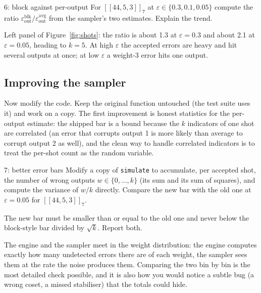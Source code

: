 \documentclass[11pt]{article}
\newcommand{\eps}{\varepsilon}
\newcommand{\code}[1]{\texttt{#1}}
\begin{document}
\begin{exercise}{6: block against per-output}
For $[[44,5,3]]_7$ at $\eps\in\{0.3,0.1,0.05\}$ compute the ratio
$\eps_{\mathrm{out}}^{\mathrm{blk}}/\eps_{\mathrm{out}}^{\mathrm{avg}}$ from the
sampler's two estimates. Explain the trend.
\end{exercise}
\begin{checkbox}
Left panel of Figure~\ref{fig:shots}: the ratio is about 1.3 at $\eps=0.3$ and about
2.1 at $\eps=0.05$, heading to $k=5$. At high $\eps$ the accepted errors are heavy and
hit several outputs at once; at low $\eps$ a weight-3 error hits one output.
\end{checkbox}

\subsection*{Improving the sampler}

Now modify the code. Keep the original function untouched (the test suite uses it)
and work on a copy. The first improvement is honest statistics for the per-output
estimate: the shipped bar is a bound because the $k$ indicators of one shot are
correlated (an error that corrupts output 1 is more likely than average to corrupt
output 2 as well), and the clean way to handle correlated indicators is to treat
the per-shot count as the random variable.

\begin{exercise}{7: better error bars}\label{ex:errbar}
Modify a copy of \code{simulate} to accumulate, per accepted shot, the number of
wrong outputs $w\in\{0,\dots,k\}$ (its sum and its sum of squares), and compute the
variance of $w/k$ directly. Compare the new bar with the old one at $\eps=0.05$ for
$[[44,5,3]]_7$.
\end{exercise}
\begin{checkbox}
The new bar must be smaller than or equal to the old one and never below the
block-style bar divided by $\sqrt{k}$. Report both.
\end{checkbox}

The engine and the sampler meet in the weight distribution: the engine computes
exactly how many undetected errors there are of each weight, the sampler sees them
at the rate the noise produces them. Comparing the two bin by bin is the most
detailed check possible, and it is also how you would notice a subtle bug (a wrong
coset, a missed stabiliser) that the totals could hide.
\end{document}
